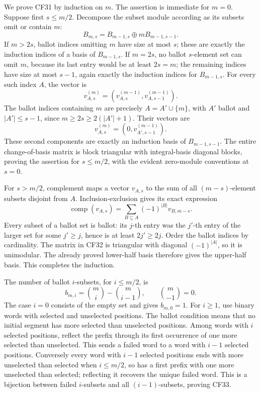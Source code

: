 \documentclass[
  10pt,
]{article}
\begin{document}
We prove CF31 by induction on \(m\). The assertion is immediate for
\(m=0\). Suppose first \(s\leq m/2\). Decompose the subset module
according as its subsets omit or contain \(m\): \[
 B_{m,s}=B_{m-1,s}\oplus mB_{m-1,s-1}.
\] If \(m>2s\), ballot indices omitting \(m\) have size at most \(s\);
these are exactly the induction indices of a basis of \(B_{m-1,s}\). If
\(m=2s\), no ballot \(s\)-element set can omit \(m\), because its last
entry would be at least \(2s=m\); the remaining indices have size at
most \(s-1\), again exactly the induction indices for \(B_{m-1,s}\). For
every such index \(A\), the vector is \[
 v_{A,s}^{(m)}=(v_{A,s}^{(m-1)},v_{A,s-1}^{(m-1)}).
\] The ballot indices containing \(m\) are precisely \(A=A'\cup\{m\}\),
with \(A'\) ballot and \(|A'|\leq s-1\), since \(m\geq2s\geq2(|A'|+1)\).
Their vectors are \[
 v_{A,s}^{(m)}=(0,v_{A',s-1}^{(m-1)}).
\] These second components are exactly an induction basis of
\(B_{m-1,s-1}\). The entire change-of-basis matrix is block triangular
with integral-basis diagonal blocks, proving the assertion for
\(s\leq m/2\), with the evident zero-module conventions at \(s=0\).

For \(s>m/2\), complement maps a vector \(v_{A,s}\) to the sum of all
\((m-s)\)-element subsets disjoint from \(A\). Inclusion-exclusion gives
its exact expression \[
 \operatorname{comp}(v_{A,s})
 =\sum_{B\subseteq A}(-1)^{|B|}v_{B,m-s}.
 \tag{CF32}
\] Every subset of a ballot set is ballot: its \(j\)-th entry was the
\(j'\)-th entry of the larger set for some \(j'\geq j\), hence is at
least \(2j'\geq2j\). Order the ballot indices by cardinality. The matrix
in CF32 is triangular with diagonal \((-1)^{|A|}\), so it is unimodular.
The already proved lower-half basis therefore gives the upper-half
basis. This completes the induction.

The number of ballot \(i\)-subsets, for \(i\leq m/2\), is \[
 b_{m,i}=\binom mi-\binom m{i-1},\qquad\binom m{-1}=0.
 \tag{CF33}
\] The case \(i=0\) consists of the empty set and gives \(b_{m,0}=1\).
For \(i\geq1\), use binary words with selected and unselected positions.
The ballot condition means that no initial segment has more selected
than unselected positions. Among words with \(i\) selected positions,
reflect the prefix through its first occurrence of one more selected
than unselected. This sends a failed word to a word with \(i-1\)
selected positions. Conversely every word with \(i-1\) selected
positions ends with more unselected than selected when \(i\leq m/2\), so
has a first prefix with one more unselected than selected; reflecting it
recovers the unique failed word. This is a bijection between failed
\(i\)-subsets and all \((i-1)\)-subsets, proving CF33.
\end{document}
